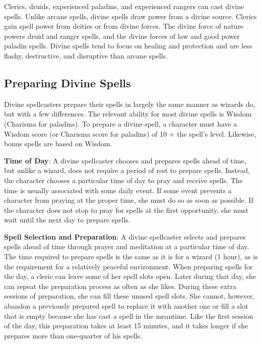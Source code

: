 				
Clerics, druids, experienced paladins, and experienced rangers can cast divine spells. Unlike arcane spells, divine spells draw power from a divine source. Clerics gain spell power from deities or from divine forces. The divine force of nature powers druid and ranger spells, and the divine forces of law and good power paladin spells. Divine spells tend to focus on healing and protection and are less flashy, destructive, and disruptive than arcane spells.
				
\subsection{Preparing Divine Spells}

				
Divine spellcasters prepare their spells in largely the same manner as wizards do, but with a few differences. The relevant ability for most divine spells is Wisdom (Charisma for paladins). To prepare a divine spell, a character must have a Wisdom score (or Charisma score for paladins) of 10 + the spell's level. Likewise, bonus spells are based on Wisdom.
				
\textbf{Time of Day}: A divine spellcaster chooses and prepares spells ahead of time, but unlike a wizard, does not require a period of rest to prepare spells. Instead, the character chooses a particular time of day to pray and receive spells. The time is usually associated with some daily event. If some event prevents a character from praying at the proper time, she must do so as soon as possible. If the character does not stop to pray for spells at the first opportunity, she must wait until the next day to prepare spells.
				
\textbf{Spell Selection and Preparation}: A divine spellcaster selects and prepares spells ahead of time through prayer and meditation at a particular time of day. The time required to prepare spells is the same as it is for a wizard (1 hour), as is the requirement for a relatively peaceful environment. When preparing spells for the day, a cleric can leave some of her spell slots open. Later during that day, she can repeat the preparation process as often as she likes. During these extra sessions of preparation, she can fill these unused spell slots. She cannot, however, abandon a previously prepared spell to replace it with another one or fill a slot that is empty because she has cast a spell in the meantime. Like the first session of the day, this preparation takes at least 15 minutes, and it takes longer if she prepares more than one-quarter of his spells.
				
